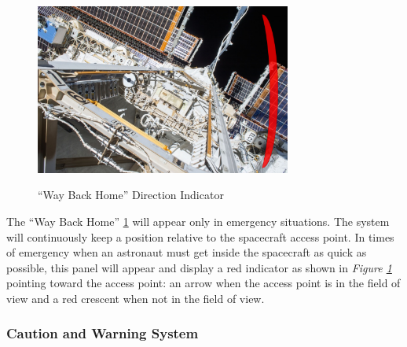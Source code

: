 \documentclass{article}
\let\Oldsubsubsection\subsubsection
\renewcommand{\subsubsection}{\FloatBarrier\Oldsubsubsection}
\begin{document}
\begin{figure}[!htb]
  \centering
  \caption{“Way Back Home” Direction Indicator}
  \includegraphics[width=0.75\textwidth]{assets/wayhome.png}
  \label{fig:wayhome}
\end{figure}

The “Way Back Home” \ref{fig:wayhome} will appear only in emergency situations. The system will continuously keep a position relative to the spacecraft access point. In times of emergency when an astronaut must get inside the spacecraft as quick as possible, this panel will appear and display a red indicator as shown in \textit{Figure \ref{fig:wayhome}} pointing toward the access point: an arrow when the access point is in the field of view and a red crescent when not in the field of view. 

\subsubsection{Caution and Warning System}
\end{document}
